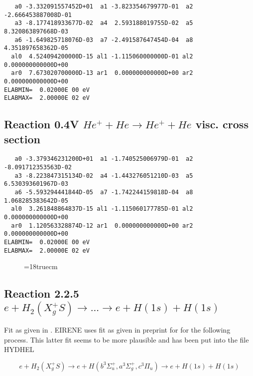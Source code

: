 \begin{verbatim}
   a0 -3.332091557452D+01  a1 -3.823354679977D-01  a2 -2.666453887008D-01
   a3 -8.177418933677D-02  a4  2.593188019755D-02  a5  8.320863897668D-03
   a6 -1.649825718076D-03  a7 -2.491587647454D-04  a8  4.351897658362D-05
  al0  4.524094200000D-15 al1 -1.115060000000D-01 al2  0.000000000000D+00
  ar0  7.673020700000D-13 ar1  0.000000000000D+00 ar2  0.000000000000D+00
ELABMIN=  0.02000E 00 eV
ELABMAX=  2.00000E 02 eV
\end{verbatim}


\subsection{
Reaction 0.4V   $  He^+ + He \rightarrow He^+ + He $  visc. cross section
}



\begin{verbatim}
   a0 -3.379346231200D+01  a1 -1.740525006979D-01  a2 -8.091712353563D-02
   a3 -8.223847315134D-02  a4 -1.443276051210D-03  a5  6.530393601967D-03
   a6 -5.593294441844D-05  a7 -1.742244159818D-04  a8  1.068285383642D-05
  al0  3.261848864837D-15 al1 -1.115060177785D-01 al2  0.000000000000D+00
  ar0  1.120563328874D-12 ar1  0.000000000000D+00 ar2  0.000000000000D+00
ELABMIN=  0.02000E 00 eV
ELABMAX=  2.00000E 02 eV
\end{verbatim}


\begin{figure} \label{0.4}
\epsfxsize=18truecm
\end{figure}
\newpage


\subsection{
Reaction 2.2.5
$ e + H_2 (X_g^+ S ) \rightarrow . . . \rightarrow e + H(1s) + H(1s) $ }

Fit as given in \cite{kn:Janev}.
 EIRENE uses fit as given in preprint for
\cite{kn:Janev}
for the following process.
This latter fit seems to be more plausible  and has been put
into the file HYDHEL





\begin{displaymath}
 e + H_2 (X_g^+ S ) \rightarrow e + H (b^3\Sigma^+_u , a^3\Sigma^+_g,
c^3\Pi_u)
             \rightarrow e + H(1s) + H(1s)
\end{displaymath}


